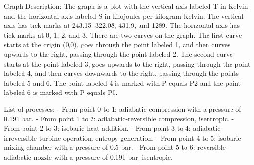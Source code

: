 Graph Description: The graph is a plot with the vertical axis labeled T in Kelvin and the horizontal axis labeled S in kilojoules per kilogram Kelvin. The vertical axis has tick marks at 243.15, 322.08, 431.9, and 1289. The horizontal axis has tick marks at 0, 1, 2, and 3. There are two curves on the graph. The first curve starts at the origin (0,0), goes through the point labeled 1, and then curves upwards to the right, passing through the point labeled 2. The second curve starts at the point labeled 3, goes upwards to the right, passing through the point labeled 4, and then curves downwards to the right, passing through the points labeled 5 and 6. The point labeled 4 is marked with P equals P2 and the point labeled 6 is marked with P equals P0.

List of processes:
- From point 0 to 1: adiabatic compression with a pressure of 0.191 bar.
- From point 1 to 2: adiabatic-reversible compression, isentropic.
- From point 2 to 3: isobaric heat addition.
- From point 3 to 4: adiabatic-irreversible turbine operation, entropy generation.
- From point 4 to 5: isobaric mixing chamber with a pressure of 0.5 bar.
- From point 5 to 6: reversible-adiabatic nozzle with a pressure of 0.191 bar, isentropic.